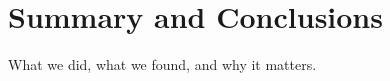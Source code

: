 \section{Summary and Conclusions}\label{s.conclusions}

What we did, what we found, and why it matters.
